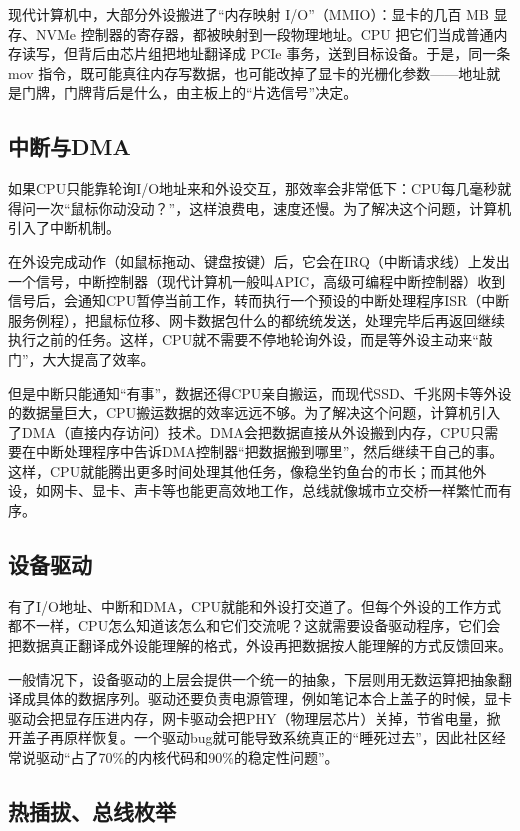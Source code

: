 现代计算机中，大部分外设搬进了“内存映射 I/O”（MMIO）：显卡的几百 MB 显存、NVMe 控制器的寄存器，都被映射到一段物理地址。CPU 把它们当成普通内存读写，但背后由芯片组把地址翻译成 PCIe 事务，送到目标设备。于是，同一条 mov 指令，既可能真往内存写数据，也可能改掉了显卡的光栅化参数——地址就是门牌，门牌背后是什么，由主板上的“片选信号”决定。

\subsection{中断与DMA}

如果CPU只能靠轮询I/O地址来和外设交互，那效率会非常低下：CPU每几毫秒就得问一次“鼠标你动没动？”，这样浪费电，速度还慢。为了解决这个问题，计算机引入了中断机制。

在外设完成动作（如鼠标拖动、键盘按键）后，它会在IRQ（中断请求线）上发出一个信号，中断控制器（现代计算机一般叫APIC，高级可编程中断控制器）收到信号后，会通知CPU暂停当前工作，转而执行一个预设的中断处理程序ISR（中断服务例程），把鼠标位移、网卡数据包什么的都统统发送，处理完毕后再返回继续执行之前的任务。这样，CPU就不需要不停地轮询外设，而是等外设主动来“敲门”，大大提高了效率。

但是中断只能通知“有事”，数据还得CPU亲自搬运，而现代SSD、千兆网卡等外设的数据量巨大，CPU搬运数据的效率远远不够。为了解决这个问题，计算机引入了DMA（直接内存访问）技术。DMA会把数据直接从外设搬到内存，CPU只需要在中断处理程序中告诉DMA控制器“把数据搬到哪里”，然后继续干自己的事。这样，CPU就能腾出更多时间处理其他任务，像稳坐钓鱼台的市长；而其他外设，如网卡、显卡、声卡等也能更高效地工作，总线就像城市立交桥一样繁忙而有序。

\subsection{设备驱动}

有了I/O地址、中断和DMA，CPU就能和外设打交道了。但每个外设的工作方式都不一样，CPU怎么知道该怎么和它们交流呢？这就需要设备驱动程序，它们会把数据真正翻译成外设能理解的格式，外设再把数据按人能理解的方式反馈回来。

一般情况下，设备驱动的上层会提供一个统一的抽象，下层则用无数运算把抽象翻译成具体的数据序列。驱动还要负责电源管理，例如笔记本合上盖子的时候，显卡驱动会把显存压进内存，网卡驱动会把PHY（物理层芯片）关掉，节省电量，掀开盖子再原样恢复。一个驱动bug就可能导致系统真正的“睡死过去”，因此社区经常说驱动“占了70\%的内核代码和90\%的稳定性问题”。

\subsection{热插拔、总线枚举}

